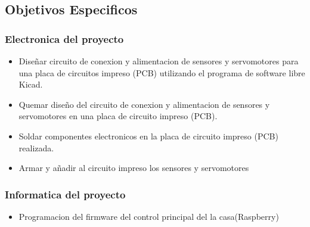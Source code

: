 \documentclass[letterpaper,12pt]{article}
\begin{document}
{		
		\subsection{Objetivos Especificos}
		
		\subsubsection{Electronica del proyecto}
		
		\begin{itemize}
			
			\item Diseñar circuito de conexion y alimentacion de sensores y servomotores para una placa de circuitos impreso (PCB) utilizando el programa de software libre Kicad.
			
			\item Quemar diseño del circuito de conexion y alimentacion de sensores y servomotores en una placa de circuito  impreso (PCB).
			
			\item Soldar componentes electronicos en la placa de circuito impreso (PCB) realizada.
			
			\item Armar y añadir al circuito impreso los sensores y servomotores 
			
		\end{itemize}
		
		
		\subsubsection{Informatica del proyecto}
		
		\begin{itemize}
			\item Programacion del firmware del control principal del la casa(Raspberry)
			

\end{itemize}}
\end{document}
